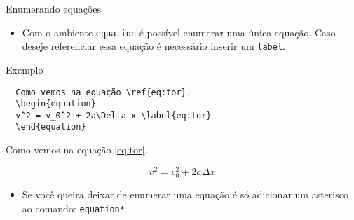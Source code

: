 \begin{frame}[fragile]{Enumerando equações}
    \begin{itemize}
    \item Com o ambiente \verb|equation| é possível enumerar uma única equação. Caso deseje referenciar essa equação é necessário inserir um \verb|label|.
    \end{itemize}

    \begin{exampleblock}{Exemplo}
    \small{
\begin{verbatim}
  Como vemos na equação \ref{eq:tor}.
  \begin{equation}
  v^2 = v_0^2 + 2a\Delta x \label{eq:tor}
  \end{equation}
\end{verbatim}
    Como vemos na equação \ref{eq:tor}.}
    \begin{equation}
    v^2 = v_0^2 + 2a\Delta x \label{eq:tor}
    \end{equation}
    \end{exampleblock}

    \begin{itemize}
    \item Se você queira deixar de enumerar uma equação é só adicionar um asterisco ao comando: \verb|equation*|
    \end{itemize}
\end{frame}

